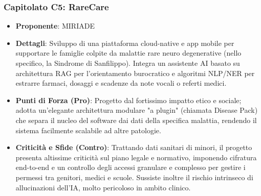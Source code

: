 \subsubsection{Capitolato C5: RareCare}
\begin{itemize}
    \item \textbf{Proponente}: MIRIADE
    \item \textbf{Dettagli}: Sviluppo di una piattaforma cloud-native e app mobile per supportare le famiglie colpite da malattie rare neuro degenerative (nello specifico, la Sindrome di Sanfilippo). Integra un assistente AI basato su architettura RAG per l'orientamento burocratico e algoritmi NLP/NER per estrarre farmaci, dosaggi e scadenze da note vocali o referti medici.

    \item \textbf{Punti di Forza (Pro)}: Progetto dal fortissimo impatto etico e sociale; adotta un'elegante architettura modulare "a plugin" (chiamata Disease Pack) che separa il nucleo del software dai dati della specifica malattia, rendendo il sistema facilmente scalabile ad altre patologie.

    \item \textbf{Criticità e Sfide (Contro)}: Trattando dati sanitari di minori, il progetto presenta altissime criticità sul piano legale e normativo, imponendo cifratura end-to-end e un controllo degli accessi granulare e complesso per gestire i permessi tra genitori, medici e scuole. Sussiste inoltre il rischio intrinseco di allucinazioni dell'IA, molto pericoloso in ambito clinico.

\end{itemize}

